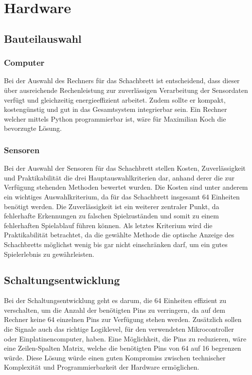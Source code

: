\section{Hardware}

\subsection{Bauteilauswahl}

\subsubsection{Computer}

Bei der Auswahl des Rechners für das Schachbrett ist entscheidend, dass dieser über ausreichende Rechenleistung zur zuverlässigen Verarbeitung der Sensordaten verfügt und gleichzeitig energieeffizient arbeitet. Zudem sollte er kompakt, kostengünstig und gut in das Gesamtsystem integrierbar sein. Ein Rechner welcher mittels Python programmierbar ist, wäre für Maximilian Koch die bevorzugte Lösung.

\subsubsection{Sensoren}
Bei der Auswahl der Sensoren für das Schachbrett stellen Kosten, Zuverlässigkeit und Praktikabilität die drei Hauptauswahlkriterien dar, anhand derer die zur Verfügung stehenden Methoden bewertet wurden. Die Kosten sind unter anderem ein wichtiges Auswahlkriterium, da für das Schachbrett insgesamt 64 Einheiten benötigt werden. Die Zuverlässigkeit ist ein weiterer zentraler Punkt, da fehlerhafte Erkennungen zu falschen Spielzuständen und somit zu einem fehlerhaften Spielablauf führen können. Als letztes Kriterium wird die Praktikabilität betrachtet, da die gewählte Methode die optische Anzeige des Schachbretts möglichst wenig bis gar nicht einschränken darf, um ein gutes Spielerlebnis zu gewährleisten.

\subsection{Schaltungsentwicklung}

Bei der Schaltungsentwicklung geht es darum, die 64 Einheiten effizient zu verschalten, um die Anzahl der benötigten Pins zu verringern, da auf dem Rechner keine 64 einzelnen Pins zur Verfügung stehen werden. Zusätzlich sollen die Signale auch das richtige Logiklevel, für den verwendeten Mikrocontroller oder Einplatinencomputer, haben. Eine Möglichkeit, die Pins zu reduzieren, wäre eine Zeilen-Spalten Matrix, welche die benötigten Pins von 64 auf 16 begrenzen würde. Diese Lösung würde einen guten Kompromiss zwischen technischer Komplexität und Programmierbarkeit der Hardware ermöglichen. 

